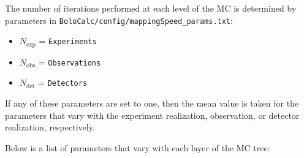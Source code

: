 \documentclass[11pt]{article} %
\begin{document}
The number of iterations performed at each level of the MC is determined by parameters in \texttt{BoloCalc/config/mappingSpeed\_params.txt}:

\begin{itemize}[noitemsep,topsep=0pt]
	\item $N_{\mathrm{exp}}$ = \texttt{Experiments}
	\item $N_{\mathrm{obs}}$ = \texttt{Observations}
	\item $N_{\mathrm{det}}$ = \texttt{Detectors}
\end{itemize}

If any of these parameters are set to one, then the mean value is taken for the parameters that vary with the experiment realization, observation, or detector realization, respectively. 

Below is a list of parameters that vary with each layer of the MC tree:
\end{document}
